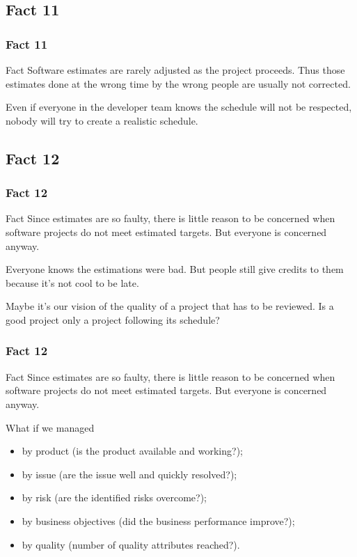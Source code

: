 \documentclass{beamer}
\begin{document}
\subsection{Fact 11}
\begin{frame}
    \frametitle{Fact 11}
    \begin{block}{Fact}
    Software estimates are rarely adjusted as the project proceeds. Thus those
    estimates done at the wrong time by the wrong people are usually not
    corrected.
    \end{block}
    \pause

    Even if everyone in the developer team knows the schedule will not be
    respected, nobody will try to create a realistic schedule.
\end{frame}

\subsection{Fact 12}
\begin{frame}
    \frametitle{Fact 12}
    \begin{block}{Fact}
    Since estimates are so faulty, there is little reason to be concerned when
    software projects do not meet estimated targets. But everyone is concerned
    anyway.
    \end{block}
    \pause

    Everyone knows the estimations were bad. But people still give credits to
    them because it's not cool to be late. \newline
    \pause

    Maybe it's our vision of the quality of a project that has to be reviewed.
    Is a good project only a project following its schedule?
\end{frame}

\begin{frame}
    \frametitle{Fact 12}
    \begin{block}{Fact}
    Since estimates are so faulty, there is little reason to be concerned when
    software projects do not meet estimated targets. But everyone is concerned
    anyway.
    \end{block}
    \pause

    What if we managed
    \begin{itemize}
        \item by product (is the product available and working?);
        \pause
        \item by issue (are the issue well and quickly resolved?);
        \pause
        \item by risk (are the identified risks overcome?);
        \pause
        \item by business objectives (did the business performance improve?);
        \pause
        \item by quality (number of quality attributes reached?).
    \end{itemize}
\end{frame}
\end{document}
